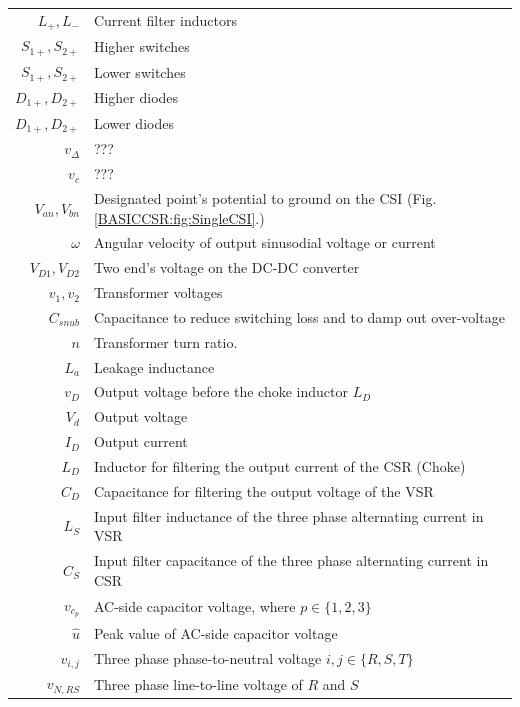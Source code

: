 \begin{scriptsize}
\begin{tabularx}{\textwidth}{r|X}
	$L_+,L_-$													& Current filter inductors\\
	$S_{1+},S_{2+}$										& Higher switches\\
	$S_{1+},S_{2+}$										& Lower switches\\
	$D_{1+},D_{2+}$										& Higher diodes\\
	$D_{1+},D_{2+}$										& Lower diodes\\
	$v_\Delta$												& ???\\
	$v_c$															& ???\\
	$V_{an},V_{bn}$  									& Designated point's potential to ground on the CSI (Fig.\ref{BASICCSR:fig:SingleCSI}.)\\
	$\omega$													& Angular velocity of output sinusodial voltage or current\\
	$V_{D1},V_{D2}$ 									& Two end's voltage on the DC-DC converter\\
	$v_1,v_2$                         & Transformer voltages\\
	$C_{snub}$ 												& Capacitance to reduce switching loss and to damp out over-voltage\\
	$n$ 															& Transformer turn ratio.\\
	$L_a$															& Leakage inductance\\
	$v_D$															& Output voltage before the choke inductor $L_D$\\
	$V_d$															& Output voltage\\
	$I_D$															& Output current\\
	$L_D$															& Inductor for filtering the output current of the CSR (Choke)\\
	$C_D$															& Capacitance for filtering the output voltage of the VSR\\
	$L_S$															& Input filter inductance of the three phase alternating current in VSR\\
	$C_S$															& Input filter capacitance of the three phase alternating current in CSR\\
	$v_{c_p}$													& AC-side capacitor voltage, where $p\in\{1,2,3\}$\\
	$\widehat{u}$											& Peak value of AC-side capacitor voltage\\
	$v_{i,j}$													& Three phase phase-to-neutral voltage $i,j\in\{R,S,T\}$\\
	$v_{N,RS}$												& Three phase line-to-line voltage of $R$ and $S$\\

\end{tabularx}
\end{scriptsize}
